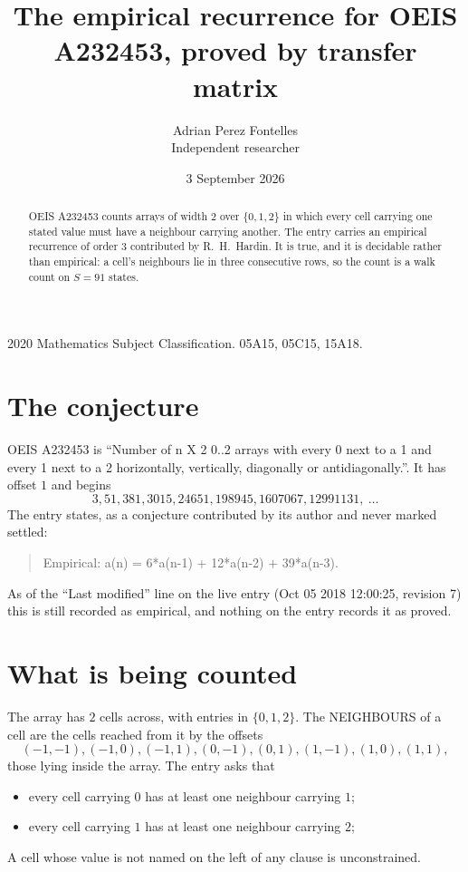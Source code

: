 \documentclass[11pt,a4paper]{article}
\title{The empirical recurrence for OEIS A232453, proved by transfer matrix}
\author{Adrian Perez Fontelles\\ \small Independent researcher}
\date{3 September 2026}
\theoremstyle{plain}
\theoremstyle{definition}
\begin{document}
\maketitle

\begin{abstract}
OEIS A232453 counts arrays of width $2$ over $\{0,1,2\}$ in which every cell carrying one stated
value must have a neighbour carrying another. The entry carries an empirical recurrence of
order $3$ contributed by R.~H.~Hardin. It is true, and it is decidable rather than
empirical: a cell's neighbours lie in three consecutive rows, so the count is a walk count on
$S=91$ states.
\end{abstract}

\noindent\small 2020 Mathematics Subject Classification. 05A15, 05C15, 15A18.\normalsize

\section{The conjecture}

OEIS A232453 is ``Number of n X 2 0..2 arrays with every 0 next to a 1 and every 1 next to a 2 horizontally, vertically, diagonally or antidiagonally.''. It has offset $1$ and begins
\[
3, 51, 381, 3015, 24651, 198945, 1607067, 12991131,\ \dots
\]
The entry states, as a conjecture contributed by its author and never marked settled:
\begin{quote}
Empirical: a(n) = 6*a(n-1) + 12*a(n-2) + 39*a(n-3).
\end{quote}
As of the ``Last modified'' line on the live entry (Oct 05 2018 12:00:25, revision 7) this is still
recorded as empirical, and nothing on the entry records it as proved.

\section{What is being counted}

The array has $2$ cells across, with entries in $\{0,1,2\}$. The NEIGHBOURS of a cell are the
cells reached from it by the offsets
\[
(-1,-1), (-1,0), (-1,1), (0,-1), (0,1), (1,-1), (1,0), (1,1),
\]
those lying inside the array. The entry asks that
\begin{itemize}
\item every cell carrying $0$ has at least one neighbour carrying $1$;
\item every cell carrying $1$ has at least one neighbour carrying $2$;

\end{itemize}
A cell whose value is not named on the left of any clause is unconstrained.
\end{document}
